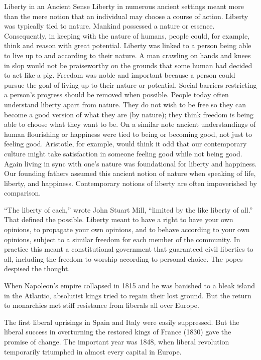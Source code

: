 \begin{sidebar}{Liberty in an Ancient Sense}
Liberty in numerous ancient settings meant more than the mere notion that an individual may choose a
course of action. Liberty was typically tied to nature. Mankind possessed a nature or essence.
Consequently, in keeping with the nature of humans, people could, for example, think and reason with
great potential. Liberty was linked to a person being able to live up to and according to their
nature. A man crawling on hands and knees in slop would not be praiseworthy on the grounds that some
human had decided to act like a pig. Freedom was noble and important because a person could pursue
the goal of living up to their nature or potential. Social barriers restricting a person’s progress
should be removed when possible. People today often understand liberty apart from nature. They do
not wish to be free so they can become a good version of what they are (by nature); they think
freedom is being able to choose what they want to be. On a similar note ancient understandings of
human flourishing or happiness were tied to being or becoming good, not just to feeling good.
Aristotle, for example, would think it odd that our contemporary culture might take satisfaction in
someone feeling good while not being good. Again living in sync with one’s nature was foundational
for liberty and happiness. Our founding fathers assumed this ancient notion of nature when speaking
of life, liberty, and happiness. Contemporary notions of liberty are often impoverished by
comparison.
\end{sidebar}

“The liberty of each,” wrote John Stuart Mill, “limited by the like liberty of all.” That defined
the possible. Liberty meant to have a right to have your own opinions, to propagate your own
opinions, and to behave according to your own opinions, subject to a similar freedom for each member
of the community. In practice this meant a constitutional government that guaranteed civil liberties
to all, including the freedom to worship according to personal choice. The popes despised the
thought.

When Napoleon’s empire collapsed in 1815 and he was banished to a bleak island in the Atlantic,
absolutist kings tried to regain their lost ground. But the return to monarchies met stiff
resistance from liberals all over Europe.

The first liberal uprisings in Spain and Italy were easily suppressed. But the liberal success in
overturning the restored kings of France (1830) gave the promise of change. The important year was
1848, when liberal revolution temporarily triumphed in almost every capital in Europe.

